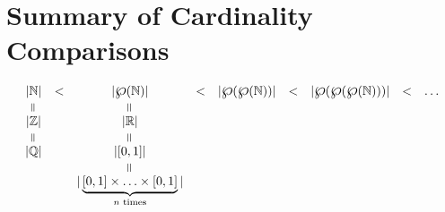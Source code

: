 \documentclass[12pt]{extarticle}
\newcommand{\re}{\rotatebox[origin=c]{90}{$=$}}
\begin{document}
\section{Summary of Cardinality Comparisons}

\vspace{3mm}

\[
\begin{array}{ccccccccc}
|\mathbb{N}| &<  &|\powerset (\mathbb{N})| &< &|\powerset(\powerset (\mathbb{N}))| &< &|\powerset(\powerset(\powerset (\mathbb{N})))| &< &\dots \\
\re & \ & \re \\
|\mathbb{Z}| & \ & |\mathbb{R}|\\
\re & \ & \re \\
|\mathbb{Q}| & \ & |[0,1]|\\
\ & \ & \re \\
\ & \ & |\underbrace{[0,1] \times \ldots \times [0,1]}_{\text{$n$ times}}|\\
\end{array}
\]
\end{document}
